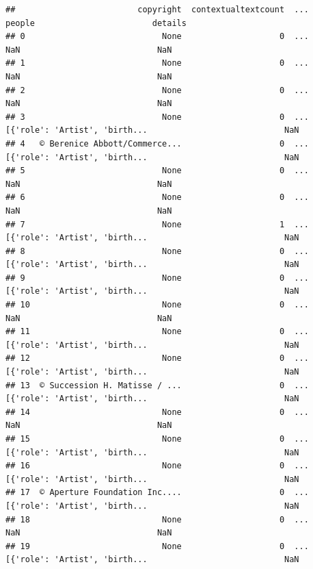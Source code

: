 \documentclass[
]{book}
\begin{document}
\begin{verbatim}
##                         copyright  contextualtextcount  ...                         people                        details
## 0                            None                    0  ...                            NaN                            NaN
## 1                            None                    0  ...                            NaN                            NaN
## 2                            None                    0  ...                            NaN                            NaN
## 3                            None                    0  ...  [{'role': 'Artist', 'birth...                            NaN
## 4   © Berenice Abbott/Commerce...                    0  ...  [{'role': 'Artist', 'birth...                            NaN
## 5                            None                    0  ...                            NaN                            NaN
## 6                            None                    0  ...                            NaN                            NaN
## 7                            None                    1  ...  [{'role': 'Artist', 'birth...                            NaN
## 8                            None                    0  ...  [{'role': 'Artist', 'birth...                            NaN
## 9                            None                    0  ...  [{'role': 'Artist', 'birth...                            NaN
## 10                           None                    0  ...                            NaN                            NaN
## 11                           None                    0  ...  [{'role': 'Artist', 'birth...                            NaN
## 12                           None                    0  ...  [{'role': 'Artist', 'birth...                            NaN
## 13  © Succession H. Matisse / ...                    0  ...  [{'role': 'Artist', 'birth...                            NaN
## 14                           None                    0  ...                            NaN                            NaN
## 15                           None                    0  ...  [{'role': 'Artist', 'birth...                            NaN
## 16                           None                    0  ...  [{'role': 'Artist', 'birth...                            NaN
## 17  © Aperture Foundation Inc....                    0  ...  [{'role': 'Artist', 'birth...                            NaN
## 18                           None                    0  ...                            NaN                            NaN
## 19                           None                    0  ...  [{'role': 'Artist', 'birth...                            NaN

\end{verbatim}
\end{document}
